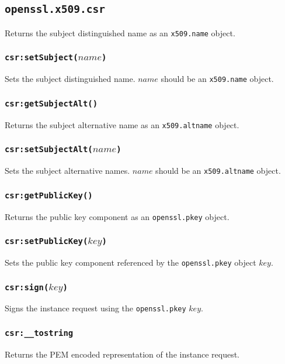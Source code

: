 \documentclass[11pt, oneside]{memoir}
\newcommand*{\fn}[1]{\texttt{#1}\xspace}
\newcommand*{\module}[1]{\texttt{#1}\xspace}
\newcounter{toccols}
\newenvironment{Module}[1]{
	\subsection{\texttt{#1}}
	\addtocontents{toc}{
		\protect\begin{multicols}{\value{toccols}}
	}
}{
	\addtocontents{toc}{\protect\end{multicols}}
}
\begin{document}
\begin{Module}{openssl.x509.csr}
Returns the subject distinguished name as an \module{x509.name} object.

\subsubsection[\fn{csr:setSubject}]{\fn{csr:setSubject($name$)}}

Sets the subject distinguished name. $name$ should be an \module{x509.name} object.

\subsubsection[\fn{csr:getSubjectAlt}]{\fn{csr:getSubjectAlt()}}

Returns the subject alternative name as an \module{x509.altname} object.

\subsubsection[\fn{csr:setSubjectAlt}]{\fn{csr:setSubjectAlt($name$)}}

Sets the subject alternative names. $name$ should be an \module{x509.altname} object.

\subsubsection[\fn{csr:getPublicKey}]{\fn{csr:getPublicKey()}}

Returns the public key component as an \module{openssl.pkey} object.

\subsubsection[\fn{csr:setPublicKey}]{\fn{csr:setPublicKey($key$)}}

Sets the public key component referenced by the \module{openssl.pkey} object $key$.

\subsubsection[\fn{csr:sign}]{\fn{csr:sign($key$)}}

Signs the instance request using the \module{openssl.pkey} $key$.

\subsubsection[\fn{csr:\_\_tostring}]{\fn{csr:\_\_tostring}}

Returns the PEM encoded representation of the instance request.

\end{Module}
\end{document}
